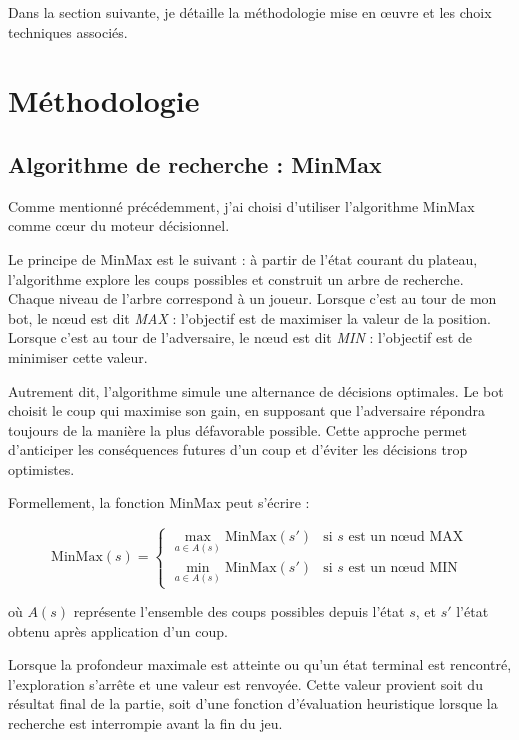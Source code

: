 \documentclass[11pt,a4paper]{article}
\begin{document}
Dans la section suivante, je détaille la méthodologie mise en œuvre et les choix techniques associés.


\section{Méthodologie}

\subsection{Algorithme de recherche : MinMax}

Comme mentionné précédemment, j'ai choisi d'utiliser l'algorithme MinMax comme cœur du moteur décisionnel.

Le principe de MinMax est le suivant : à partir de l'état courant du plateau, l'algorithme explore les coups possibles et
construit un arbre de recherche. Chaque niveau de l'arbre correspond à un joueur. Lorsque c'est au tour de mon bot, le nœud est dit
\textit{MAX} : l'objectif est de maximiser la valeur de la position. Lorsque c'est au tour de l'adversaire, le nœud est dit
\textit{MIN} : l'objectif est de minimiser cette valeur.

Autrement dit, l'algorithme simule une alternance de décisions optimales. Le bot choisit le coup qui maximise son gain, en
supposant que l'adversaire répondra toujours de la manière la plus défavorable possible. Cette approche permet d'anticiper les
conséquences futures d'un coup et d'éviter les décisions trop optimistes.

Formellement, la fonction MinMax peut s'écrire :

\[
\text{MinMax}(s) =
\begin{cases}
\max\limits_{a \in A(s)} \text{MinMax}(s') & \text{si } s \text{ est un nœud MAX} \\
\min\limits_{a \in A(s)} \text{MinMax}(s') & \text{si } s \text{ est un nœud MIN}
\end{cases}
\]

où $A(s)$ représente l'ensemble des coups possibles depuis l'état $s$, et $s'$ l'état obtenu après application d'un coup.

Lorsque la profondeur maximale est atteinte ou qu'un état terminal est rencontré, l'exploration s'arrête et une valeur est
renvoyée. Cette valeur provient soit du résultat final de la partie, soit d'une fonction d'évaluation heuristique lorsque
la recherche est interrompie avant la fin du jeu.
\end{document}
